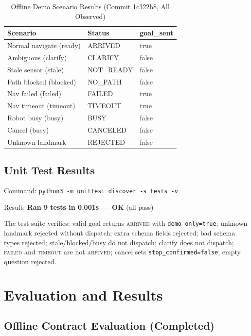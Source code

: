 \documentclass[conference]{IEEEtran}
\begin{document}
\begin{table}[htbp]
\caption{Offline Demo Scenario Results (Commit 1c322b8, All Observed)}
\label{tab:results}
\centering
\renewcommand{\arraystretch}{1.1}
\begin{tabular}{@{}p{1.8cm}p{1.4cm}p{0.8cm}@{}}
\toprule
\textbf{Scenario} & \textbf{Status} & \textbf{goal\_sent} \\
\midrule
Normal navigate (ready)  & ARRIVED    & true  \\
Ambiguous (clarify)      & CLARIFY    & false \\
Stale sensor (stale)     & NOT\_READY & false \\
Path blocked (blocked)   & NO\_PATH   & false \\
Nav failed (failed)      & FAILED     & true  \\
Nav timeout (timeout)    & TIMEOUT    & true  \\
Robot busy (busy)        & BUSY       & false \\
Cancel (busy)            & CANCELED   & false \\
Unknown landmark         & REJECTED   & false \\
\bottomrule
\end{tabular}
\end{table}

\subsection{Unit Test Results}

\noindent Command: \texttt{python3 -m unittest discover -s tests -v}

\noindent Result: \textbf{Ran 9 tests in 0.001s --- OK} (all pass)

The test suite verifies: valid goal returns \textsc{arrived} with
\texttt{demo\_only=true}; unknown landmark rejected without dispatch; extra schema
fields rejected; bad schema types rejected; stale/blocked/busy do not dispatch;
clarify does not dispatch; \textsc{failed} and \textsc{timeout} are not
\textsc{arrived}; cancel sets \texttt{stop\_confirmed=false}; empty question rejected.

\section{Evaluation and Results}

\subsection{Offline Contract Evaluation (Completed)}
\end{document}
